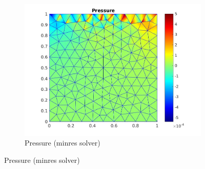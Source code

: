 \documentclass[a4paper]{book}
\begin{document}
\begin{figure}[H]
\begin{subfigure}{\textwidth}	
  \includegraphics[width=\linewidth]{lid_minres_pressure.jpg}
  \caption{Pressure (minres solver)}
  \label{pressure_stoke_minres_lid}
\end{subfigure}

\end{figure}
\end{document}
